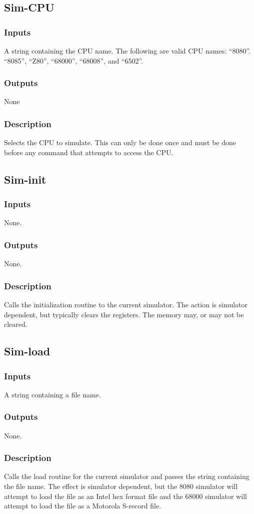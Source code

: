 \documentclass[10pt, openany]{book}
\begin{document}
\subsection{Sim-CPU}
\subsubsection{Inputs}
A string containing the CPU name.  The following are valid CPU names:  ``8080''. ``8085'', ``Z80'', ``68000'', ``68008'', and ``6502''.
\subsubsection{Outputs}
None
\subsubsection{Description}
Selects the CPU to simulate.  This can only be done once and must be done before any command that attempts to access the CPU.

\subsection{Sim-init}
\subsubsection{Inputs}
None.
\subsubsection{Outputs}
None.
\subsubsection{Description}
Calls the initialization routine to the current simulator.  The action is simulator dependent, but typically clears the registers.  The memory may, or may not be cleared.

\subsection{Sim-load}
\subsubsection{Inputs}
A string containing a file name.
\subsubsection{Outputs}
None.
\subsubsection{Description}
Calls the load routine for the current simulator and passes the string containing the file name.  The effect is simulator dependent, but the 8080 simulator will attempt to load the file as an Intel hex format file and the 68000 simulator will attempt to load the file as a Motorola S-record file.
\end{document}
